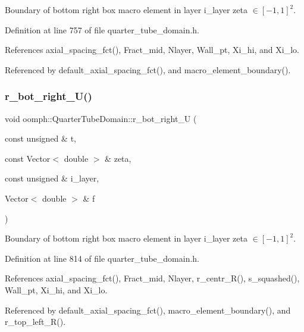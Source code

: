 Boundary of bottom right box macro element in layer i\+\_\+layer zeta $ \in [-1,1]^2 $. 



Definition at line 757 of file quarter\+\_\+tube\+\_\+domain.\+h.



References axial\+\_\+spacing\+\_\+fct(), Fract\+\_\+mid, Nlayer, Wall\+\_\+pt, Xi\+\_\+hi, and Xi\+\_\+lo.



Referenced by default\+\_\+axial\+\_\+spacing\+\_\+fct(), and macro\+\_\+element\+\_\+boundary().

\mbox{\label{classoomph_1_1QuarterTubeDomain_aa733400bf322afaa379bad3e21e6ade0}} 
\subsubsection{\texorpdfstring{r\+\_\+bot\+\_\+right\+\_\+\+U()}{r\_bot\_right\_U()}}
{\footnotesize\ttfamily void oomph\+::\+Quarter\+Tube\+Domain\+::r\+\_\+bot\+\_\+right\+\_\+U (\begin{DoxyParamCaption}\item[{const unsigned \&}]{t,  }\item[{const Vector$<$ double $>$ \&}]{zeta,  }\item[{const unsigned \&}]{i\+\_\+layer,  }\item[{Vector$<$ double $>$ \&}]{f }\end{DoxyParamCaption})\hspace{0.3cm}{\ttfamily [private]}}



Boundary of bottom right box macro element in layer i\+\_\+layer zeta $ \in [-1,1]^2 $. 



Definition at line 814 of file quarter\+\_\+tube\+\_\+domain.\+h.



References axial\+\_\+spacing\+\_\+fct(), Fract\+\_\+mid, Nlayer, r\+\_\+centr\+\_\+\+R(), s\+\_\+squashed(), Wall\+\_\+pt, Xi\+\_\+hi, and Xi\+\_\+lo.



Referenced by default\+\_\+axial\+\_\+spacing\+\_\+fct(), macro\+\_\+element\+\_\+boundary(), and r\+\_\+top\+\_\+left\+\_\+\+R().

